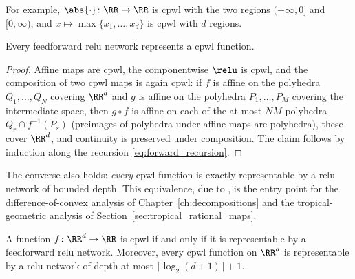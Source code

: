 For example, $\abs{\cdot} \colon \RR \to \RR$ is \ac{cpwl} with the two regions $(-\infty, 0]$ and $[0, \infty)$, and $x \mapsto \max\{x_1, \ldots, x_d\}$ is \ac{cpwl} with $d$ regions.

\begin{observation}\label{obs:relu_is_cpwl}
Every feedforward \ac{relu} network represents a \ac{cpwl} function.
\end{observation}

\begin{proof}
Affine maps are \ac{cpwl}, the componentwise $\relu$ is \ac{cpwl}, and the composition of two \ac{cpwl} maps is again \ac{cpwl}: if $f$ is affine on the polyhedra $Q_1, \ldots, Q_N$ covering $\RR^d$ and $g$ is affine on the polyhedra $P_1, \ldots, P_M$ covering the intermediate space, then $g \circ f$ is affine on each of the at most $NM$ polyhedra $Q_r \cap f^{-1}(P_s)$ (preimages of polyhedra under affine maps are polyhedra), these cover $\RR^d$, and continuity is preserved under composition. The claim follows by induction along the recursion \eqref{eq:forward_recursion}.
\end{proof}

The converse also holds: \emph{every} \ac{cpwl} function is exactly representable by a \ac{relu} network of bounded depth. This equivalence, due to \textcite{Arora2018}, is the entry point for the difference-of-convex analysis of Chapter~\ref{ch:decompositions} and the tropical-geometric analysis of Section~\ref{sec:tropical_rational_maps}.

\begin{theoremenv}\label{thm:cpwl_relu_equivalence}
A function $f \colon \RR^{d} \to \RR$ is \ac{cpwl} if and only if it is representable by a feedforward \ac{relu} network. Moreover, every \ac{cpwl} function on $\RR^d$ is representable by a \ac{relu} network of depth at most $\bigl\lceil \log_2(d+1) \bigr\rceil + 1$.
\end{theoremenv}

